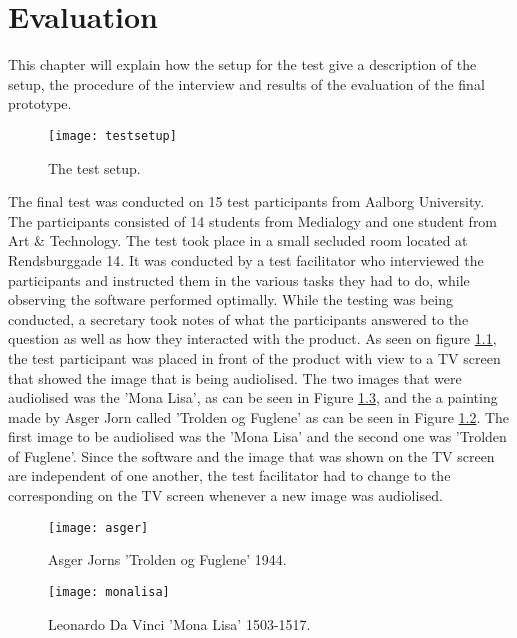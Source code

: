 \chapter{Evaluation}\label{ch:evaluation}
This chapter will explain how the setup for the test give a description of the setup, the procedure of the interview and results of the evaluation of the final prototype. 

\begin{figure}[!h] 
\centering
\texttt{[image: testsetup]}
\caption{\label{fig:testsetup} The test setup.}
\end{figure}

The final test was conducted on 15 test participants from Aalborg University. The participants consisted of 14 students from Medialogy and one student from Art \& Technology. The test took place in a small secluded room located at Rendsburggade 14. It was conducted by a test facilitator who interviewed the participants and instructed them in the various tasks they had to do, while observing the software performed optimally. While the testing was being conducted, a secretary took notes of what the participants answered to the question as well as how they interacted with the product.
As seen on figure \ref{fig:testsetup}, the test participant was placed in front of the product with view to a TV screen that showed the image that is being audiolised. The two images that were audiolised was the 'Mona Lisa', as can be seen in Figure \ref{fig:monalisa}, and the a painting made by Asger Jorn called 'Trolden og Fuglene' as can be seen in Figure \ref{fig:asger}. The first image to be audiolised was the 'Mona Lisa' and the second one was 'Trolden of Fuglene'. Since the software and the image that was shown on the TV screen are independent of one another, the test facilitator had to change to the corresponding on the TV screen whenever a new image was audiolised.

\begin{figure}[!h] 
\centering
\texttt{[image: asger]}
\caption{\label{fig:asger} Asger Jorns 'Trolden og Fuglene' 1944.}
\end{figure}

\begin{figure}[!h] 
\centering
\texttt{[image: monalisa]}
\caption{\label{fig:monalisa} Leonardo Da Vinci 'Mona Lisa' 1503-1517.}
\end{figure}

